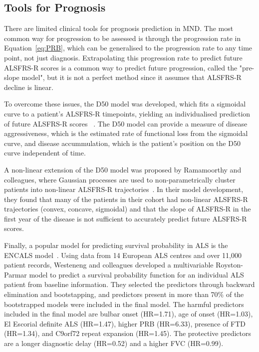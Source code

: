 \subsection{Tools for Prognosis}

There are limited clinical tools for prognosis prediction in MND. The most common way for progression to be assessed is through the progression rate in Equation~\ref{eq:PRB}, which can be generalised to the progression rate to any time point, not just diagnosis.
Extrapolating this progression rate to predict future ALSFRS-R scores is a common way to predict future progression, called the "pre-slope model", but it is not a perfect method since it assumes that ALSFRS-R decline is linear.

To overcome these issues, the D50 model was developed, which fits a sigmoidal curve to a patient's ALSFRS-R timepoints, yielding an individualised prediction of future ALSFRS-R scores
~\cite{poesenNeurofilamentMarkersALS2017, steinbachApplyingD50Disease2020}.
The D50 model can provide a measure of disease aggressiveness, which is the estimated rate of functional loss from the sigmoidal curve, and disease accummulation, which is the patient's position on the D50 curve independent of time.

A non-linear extension of the D50 model was proposed by Ramamoorthy and colleagues, where Gaussian processes are used to non-parametrically cluster patients into non-linear ALSFRS-R trajectories~\cite{ramamoorthyIdentifyingPatternsAmyotrophic2022}.
In their model development, they found that many of the patients in their cohort had non-linear ALSFRS-R trajectories (convex, concave, sigmoidal) and that the slope of ALSFRS-R in the first year of the disease is not sufficient to accurately predict future ALSFRS-R scores.

Finally, a popular model for predicting survival probability in ALS is the ENCALS model~\cite{westenengPrognosisPatientsAmyotrophic2018}.
Using data from 14 European ALS centres and over 11,000 patient records, Westeneng and colleagues developed a multivariable Royston-Parmar model to predict a survival probability function for an individual ALS patient from baseline information.
They selected the predictors through backward elimination and bootstapping, and predictors present in more than 70\% of the bootstrapped models were included in the final model.
The harmful predictors included in the final model are bulbar onset (HR=1.71), age of onset (HR=1.03), El Escorial definite ALS (HR=1.47), higher PRB (HR=6.33), presence of FTD (HR=1.34), and C9orf72 repeat expansion (HR=1.45).
The protective predictors are a longer diagnostic delay (HR=0.52) and a higher FVC (HR=0.99).

